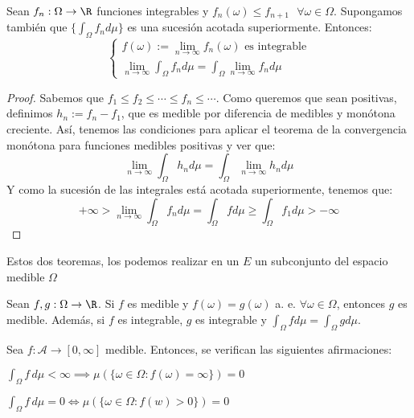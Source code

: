 \begin{nth}
  Sean $f_n: \Omega \to \R$ funciones integrables y $f_n(\omega) \leq f_{n+1} \ \ \ \forall \omega \in \Omega$. Supongamos también que $\{\int_\Omega f_n d\mu\}$ es una sucesión acotada superiormente. Entonces:
  $$ \begin{cases}
    f(\omega):= \lim_{n\to \infty}f_n(\omega) \text{ es integrable}\\
    \lim_{n \to \infty} \int_\Omega f_n d\mu = \int_{\Omega}\lim_{n\to \infty} f_n d\mu
  \end{cases}$$

\end{nth}
\begin{proof}
  Sabemos que $f_1 \leq f_2 \leq \cdots \leq f_n \leq \cdots $. Como queremos que sean positivas, definimos $h_n:= f_n - f_1$, que es medible por diferencia de medibles y monótona creciente. Así, tenemos las condiciones para aplicar el teorema de la convergencia monótona para funciones medibles positivas y ver que:
  $$ \lim_{n \to \infty} \int_\Omega h_n d\mu = \int_\Omega \lim_{n \to \infty}h_n d\mu$$
  Y como la sucesión de las integrales está acotada superiormente, tenemos que:
  $$ +\infty > \lim_{n\to \infty} \int_\Omega f_n d\mu = \int_\Omega f d\mu \geq \int_\Omega f_1 d\mu > -\infty$$
\end{proof}

\begin{nota}
  Estos dos teoremas, los podemos realizar en un $E$ un subconjunto del espacio medible $\Omega$
\end{nota}

\begin{nprop}
  Sean $f,g: \Omega \to \R$. Si $f$ es medible y $f(\omega) =  g(\omega)$ a. e. $\forall \omega \in \Omega$, entonces $g$ es medible. Además, si $f$ es integrable, $g$ es integrable y $\int_\Omega f d\mu = \int_\Omega g d\mu$.
\end{nprop}


\begin{nprop} Sea $f:\mathscr A \to [0,\infty]$ medible. Entonces, se verifican las siguientes afirmaciones:
  \begin{nlist}

  \item $\displaystyle \int_\Omega f\, d\mu < \infty \implies \mu(\{\omega \in \Omega: f(\omega) =  \infty\}) = 0$
  \item $\displaystyle \int_\Omega f\, d\mu = 0 \iff \mu(\{\omega \in \Omega : f(w) > 0\}) = 0$
\end{nlist}
\end{nprop}

